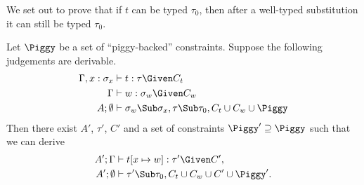 \def\Xdef{w}
\def\Exigent{\emptyset}
We set out to prove that if $t$ can be typed $\tau_0$, then after
a well-typed substitution it can still be typed $\tau_0$.

Let $\Piggy$ be a set of ``piggy-backed'' constraints. Suppose
the following judgements are derivable.
\begin{align}
\Gamma,x:\sigma_x&\vdash t:\tau\Given C_t \notag
\\
\Gamma&\vdash \Xdef:\sigma_\Xdef \Given C_\Xdef \notag
\\
A;\Exigent&\vdash
\sigma_\Xdef\Sub\sigma_x, \tau\Sub\tau_0,C_t\cup C_\Xdef\cup\Piggy
\label{eq:subass}
\end{align}
Then there exist $A'$, $\tau'$, $C'$ and a set of constraints
$\Piggy'\supseteq\Piggy$ such that we can derive
\begin{align*}
A';\Gamma&\vdash t[x\mapsto \Xdef] : \tau'\Given C',\\
A';\Exigent &\vdash \tau'\Sub\tau_0, C_t\cup C_\Xdef\cup C'\cup\Piggy'.
\end{align*}


